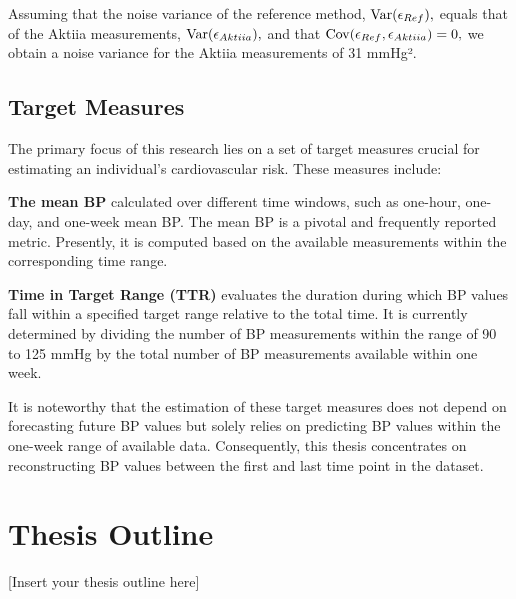 Assuming that the noise variance of the reference method, $\operatorname{Var}(\epsilon_{Ref}),$
equals that of the Aktiia measurements, $\operatorname{Var}(\epsilon_{Aktiia}),$ and that
$\operatorname{Cov}(\epsilon_{Ref}, \epsilon_{Aktiia})=0,$ we obtain a noise variance for the Aktiia
measurements of 31 mmHg².

\subsection{Target Measures}\label{subsec:target-measures}

The primary focus of this research lies on a set of target measures crucial for
estimating an individual's cardiovascular risk. These measures include:

\textbf{The mean BP} calculated over different time windows, such as one-hour,
one-day, and one-week mean BP. The mean BP is a pivotal and frequently reported
metric. Presently, it is computed based on the available measurements within the
corresponding time range.

\textbf{Time in Target Range (TTR)} evaluates the duration during which BP values
fall within a specified target range relative to the total time. It is currently
determined by dividing the number of BP measurements within the range of 90 to
125 mmHg by the total number of BP measurements available within one week.

It is noteworthy that the estimation of these target measures does not depend on
forecasting future BP values but solely relies on predicting BP values within the
one-week range of available data. Consequently, this thesis concentrates on
reconstructing BP values between the first and last time point in the dataset.

\section{Thesis Outline}

[Insert your thesis outline here]
